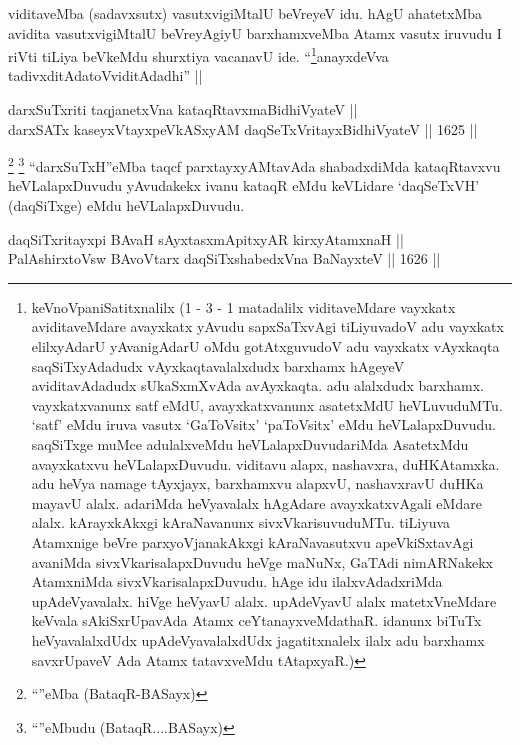 \begin{artha}
viditaveMba (sadavxsutx) vasutxvigiMtalU beVreyeV idu. hAgU ahatetxMba avidita vasutxvigiMtalU beVreyAgiyU barxhamxveMba Atamx vasutx iruvudu I riVti tiLiya beVkeMdu shurxtiya vacanavU ide. ``\footnote{keVnoVpaniSatitxnalilx (1 - 3 - 1 matadalilx viditaveMdare vayxkatx aviditaveMdare avayxkatx yAvudu sapxSaTxvAgi tiLiyuvadoV adu vayxkatx elilxyAdarU yAvanigAdarU oMdu gotAtxguvudoV adu vayxkatx vAyxkaqta saqSiTxyAdadudx vAyxkaqtavalalxdudx barxhamx hAgeyeV aviditavAdadudx sUkaSxmXvAda avAyxkaqta. adu alalxdudx barxhamx. vayxkatxvanunx satf eMdU, avayxkatxvanunx asatetxMdU heVLuvuduMTu. `satf' eMdu iruva vasutx `GaToV\s sitx' `paToV\s sitx' eMdu heVLalapxDuvudu. saqSiTxge muMce adulalxveMdu heVLalapxDuvudariMda AsatetxMdu avayxkatxvu heVLalapxDuvudu. viditavu alapx, nashavxra, duHKAtamxka. adu heVya namage tAyxjayx, barxhamxvu alapxvU, nashavxravU duHKa mayavU alalx. adariMda heVyavalalx hAgAdare avayxkatxvAgali eMdare alalx. kArayxkAkxgi kAraNavanunx sivxVkarisuvuduMTu. tiLiyuva Atamxnige beVre parxyoVjanakAkxgi kAraNavasutxvu apeVkiSxtavAgi avaniMda sivxVkarisalapxDuvudu heVge maNuNx, GaTAdi nimARNakekx AtamxniMda sivxVkarisalapxDuvudu. hAge idu ilalxvAdadxriMda upAdeVyavalalx. hiVge heVyavU alalx. upAdeVyavU alalx matetxVneMdare keVvala sAkiSxrUpavAda Atamx ceYtanayxveMdathaR. idanunx biTuTx heVyavalalxdUdx upAdeVyavalalxdUdx jagatitxnalelx ilalx adu barxhamx savxrUpaveV Ada Atamx tatavxveMdu tAtapxyaR.)}anayxdeVva tadivxditAdatoV\s viditAdadhi'' ||
\end{artha}


\begin{shl}
darxSuTxriti taqjanetxVna kataqRtavxmaBidhiVyateV || \\
darxSATx kaseyxVtayxpeVkASxyAM daqSeTxVritayxBidhiVyateV ||  1625 ||  
\end{shl}

\begin{artha}
\footnote{``\stext''eMba (BataqR-BASayx)}
\footnote{``\stext''eMbudu (BataqR....BASayx)}
``darxSuTxH''eMba taqcf parxtayxyAMtavAda shabadxdiMda kataqRtavxvu heVLalapxDuvudu yAvudakekx ivanu kataqR eMdu keVLidare `daqSeTxVH' (daqSiTxge) eMdu heVLalapxDuvudu.
\end{artha}


\begin{shl}
daqSiTxritayxpi BAvaH sAyxtasxmApitxyAR kirxyAtamxnaH || \\
PalAshirxtoV\s sw BAvoV\s tarx daqSiTxshabedxVna BaNayxteV ||  1626 ||  
\end{shl}

